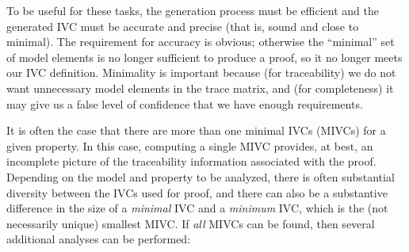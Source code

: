 \noindent To be useful for these tasks, the generation process must be efficient and the generated IVC must be accurate and precise (that is, sound and close to minimal).  The requirement for accuracy is obvious; otherwise the ``minimal'' set of model elements is no longer sufficient to produce a proof, so it no longer meets our IVC definition.  Minimality is important because (for traceability) we do not want unnecessary model elements in the trace matrix, and (for completeness) it may give us a false level of confidence that we have enough requirements.

It is often the case that there are more than one minimal IVCs (MIVCs) for a given property.  In this case, computing a single MIVC provides, at best, an incomplete picture of the traceability information associated with the proof.  Depending on the model and property to be analyzed, there is often substantial diversity between the IVCs used for proof, and there can also be a substantive difference in the size of a {\em minimal} IVC and a {\em minimum} IVC, which is the (not necessarily unique) smallest MIVC.  If {\em all} MIVCs can be found, then several additional analyses can be performed:

